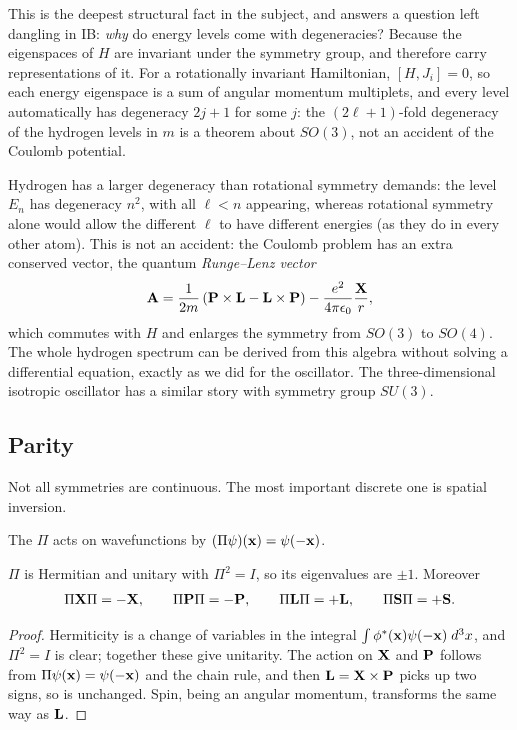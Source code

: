 \documentclass[a4paper]{scrartcl}
\begin{document}
This is the deepest structural fact in the subject, and answers a question left dangling in IB: \emph{why} do energy levels come with degeneracies? Because the eigenspaces of $H$ are invariant under the symmetry group, and therefore carry representations of it. For a rotationally invariant Hamiltonian, $[H, J_i] = 0$, so each energy eigenspace is a sum of angular momentum multiplets, and every level automatically has degeneracy $2j+1$ for some $j$: the $(2\ell+1)$-fold degeneracy of the hydrogen levels in $m$ is a theorem about $SO(3)$, not an accident of the Coulomb potential.

\begin{example}
    Hydrogen has a larger degeneracy than rotational symmetry demands: the level $E_n$ has degeneracy $n^2$, with all $\ell < n$ appearing, whereas rotational symmetry alone would allow the different $\ell$ to have different energies (as they do in every other atom). This is not an accident: the Coulomb problem has an extra conserved vector, the quantum \emph{Runge--Lenz vector}
    $$
    \mathbf{A} = \frac{1}{2m}\left( \mathbf{P} \times \mathbf{L} - \mathbf{L} \times \mathbf{P} \right) - \frac{e^2}{4\pi\epsilon_0}\frac{\mathbf{X}}{r},
    $$
    which commutes with $H$ and enlarges the symmetry from $SO(3)$ to $SO(4)$. The whole hydrogen spectrum can be derived from this algebra without solving a differential equation, exactly as we did for the oscillator. The three-dimensional isotropic oscillator has a similar story with symmetry group $SU(3)$.
\end{example}

\subsection{Parity}

Not all symmetries are continuous. The most important discrete one is spatial inversion.

\begin{definition}[Parity]
    The  $\Pi$ acts on wavefunctions by $(\Pi\psi)(\mathbf{x}) = \psi(-\mathbf{x})$.
\end{definition}

\begin{proposition}
    $\Pi$ is Hermitian and unitary with $\Pi^2 = I$, so its eigenvalues are $\pm1$. Moreover
    $$
    \Pi \mathbf{X} \Pi = -\mathbf{X}, \qquad \Pi \mathbf{P} \Pi = -\mathbf{P}, \qquad \Pi \mathbf{L} \Pi = +\mathbf{L}, \qquad \Pi\mathbf{S}\Pi = +\mathbf{S}.
    $$
\end{proposition}
\begin{proof}
    Hermiticity is a change of variables in the integral $\int \phi^*(\mathbf{x})\psi(-\mathbf{x})\; d^3x$, and $\Pi^2 = I$ is clear; together these give unitarity. The action on $\mathbf{X}$ and $\mathbf{P}$ follows from $\Pi\psi(\mathbf{x}) = \psi(-\mathbf{x})$ and the chain rule, and then $\mathbf{L} = \mathbf{X} \times \mathbf{P}$ picks up two signs, so is unchanged. Spin, being an angular momentum, transforms the same way as $\mathbf{L}$.
\end{proof}
\end{document}
